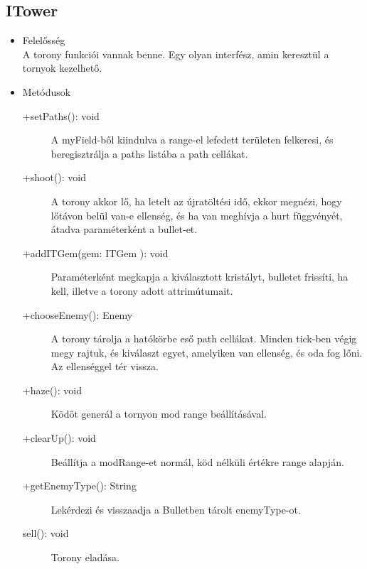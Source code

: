 \subsection{ITower}
\begin{itemize}
\item Felelősség\\
A torony funkciói vannak benne. Egy olyan interfész, amin keresztül a tornyok kezelhető.
\item Metódusok
	\begin{description}
		\item[+setPaths(): void] A myField-ből kiindulva a range-el lefedett területen felkeresi, és beregisztrálja a paths listába a path cellákat. 
\item[+shoot(): void] A torony akkor lő, ha letelt az újratöltési idő, ekkor megnézi, hogy lőtávon belül van-e ellenség, és ha van meghívja a hurt függvényét, átadva paraméterként a bullet-et. 
\item[+addITGem(gem: ITGem ): void] Paraméterként megkapja a kiválasztott kristályt, bulletet frissíti, ha kell, illetve a torony adott attrimútumait. 
\item[+chooseEnemy(): Enemy] A torony tárolja a hatókörbe eső path cellákat. Minden tick-ben végig megy rajtuk, és kiválaszt egyet, amelyiken van ellenség, és oda fog lőni. Az ellenséggel tér vissza. 
\item[+haze(): void] Ködöt generál a tornyon mod range beállításával. 
\item[+clearUp(): void] Beállítja a modRange-et normál, köd nélküli értékre range alapján. 
\item[+getEnemyType(): String] Lekérdezi és visszaadja a Bulletben tárolt enemyType-ot.
\item[sell(): void] Torony eladása. 

		
		
	\end{description}
\end{itemize}
